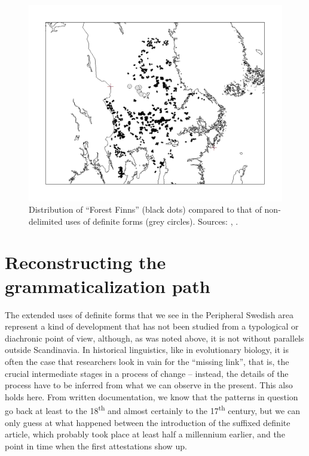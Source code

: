 \begin{figure}[h]

\includegraphics[height=.3\textheight]{figures/20_ForestFinns}
\caption{Distribution of “Forest Finns” (black dots) compared to that of non-delimited uses of definite forms (grey circles). Sources: \citet{Tarkiainen1990}, \citet{Broberg1980}.}
\label{map:16}

\end{figure}

\section{ Reconstructing the grammaticalization path}
\label{bkm:Ref154983462}

The extended uses of definite forms that we see in the Peripheral Swedish area represent a kind of development that has not been studied from a typological or diachronic point of view, although, as was noted above, it is not without parallels outside Scandinavia. In historical linguistics, like in evolutionary biology, it is often the case that researchers look in vain for the “missing link”, that is, the crucial intermediate stages in a process of change – instead, the details of the process have to be inferred from what we can observe in the present. This also holds here. From written documentation, we know that the patterns in question go back at least to the 18\textsuperscript{th} and almost certainly to the 17\textsuperscript{th} century, but we can only guess at what happened between the introduction of the suffixed definite article, which probably took place at least half a millennium earlier, and the point in time when the first attestations show up. 


